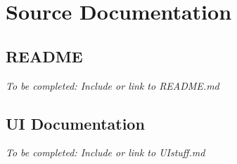 \appendix

\chapter{Source Documentation}

\section{README}

\textit{To be completed: Include or link to README.md}

\section{UI Documentation}

\textit{To be completed: Include or link to UIstuff.md}
